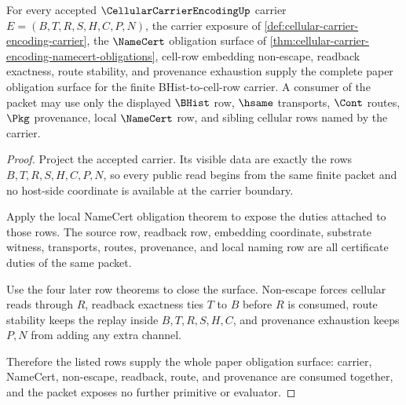 \begin{theorem}\label{thm:cellular-carrier-encoding-obligation-closure}
For every accepted $\CellularCarrierEncodingUp$ carrier $E=(B,T,R,S,H,C,P,N)$, the carrier exposure of \autoref{def:cellular-carrier-encoding-carrier}, the $\NameCert$ obligation surface of \autoref{thm:cellular-carrier-encoding-namecert-obligations}, cell-row embedding non-escape, readback exactness, route stability, and provenance exhaustion supply the complete paper obligation surface for the finite BHist-to-cell-row carrier. A consumer of the packet may use only the displayed $\BHist$ row, $\hsame$ transports, $\Cont$ routes, $\Pkg$ provenance, local $\NameCert$ row, and sibling cellular rows named by the carrier.
\end{theorem}
\begin{proof}
Project the accepted carrier. Its visible data are exactly the rows $B,T,R,S,H,C,P,N$, so every public read begins from the same finite packet and no host-side coordinate is available at the carrier boundary.

Apply the local NameCert obligation theorem to expose the duties attached to those rows. The source row, readback row, embedding coordinate, substrate witness, transports, routes, provenance, and local naming row are all certificate duties of the same packet.

Use the four later row theorems to close the surface. Non-escape forces cellular reads through $R$, readback exactness ties $T$ to $B$ before $R$ is consumed, route stability keeps the replay inside $B,T,R,S,H,C$, and provenance exhaustion keeps $P,N$ from adding any extra channel.

Therefore the listed rows supply the whole paper obligation surface: carrier, NameCert, non-escape, readback, route, and provenance are consumed together, and the packet exposes no further primitive or evaluator.
\end{proof}

